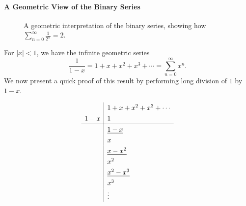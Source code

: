 \documentclass[docmute]{article}
\begin{document}
\paragraph{A Geometric View of the Binary Series}\label{par:gf-binary-series}
\begin{figure}[ht]
  \centering
\caption{A geometric interpretation of the binary series, showing how 
\(\sum_{n=0}^{\infty} \tfrac{1}{2^n} = 2\).}
\end{figure}
For \(|x| < 1\), we have the infinite geometric series
\[
\frac{1}{1-x} = 1 + x + x^2 + x^3 + \cdots = \sum_{n=0}^{\infty} x^n.
\]
We now present a quick proof of this result by performing long division of \(1\) by \(1-x\).

\[
\renewcommand{\arraystretch}{1.3}
\begin{array}{r|l}
 & 1 + x + x^2 + x^3 + \cdots \\ %
1 - x & 1  \\ %
\hline
 & \underline{1 - x} \\
 & x \\
 & \underline{x - x^2} \\
 & x^2 \\
 & \underline{x^2 - x^3} \\
 & x^3 \\
 & \vdots
\end{array}
\]
\end{document}
